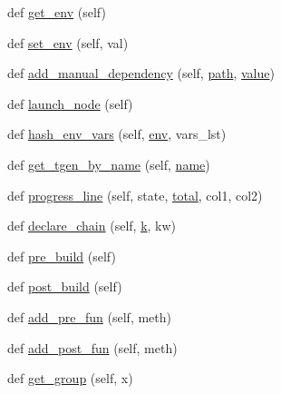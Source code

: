 \begin{DoxyCompactItemize}
\item 
def \hyperlink{classwaflib_1_1_build_1_1_build_context_a39240d22a6d298b74dabc40d8fb193a8}{get\+\_\+env} (self)
\item 
def \hyperlink{classwaflib_1_1_build_1_1_build_context_a8605b754128e554773a5962b55ec0741}{set\+\_\+env} (self, val)
\item 
def \hyperlink{classwaflib_1_1_build_1_1_build_context_aa550cf2655c922455d53077b4f1e4be1}{add\+\_\+manual\+\_\+dependency} (self, \hyperlink{classwaflib_1_1_build_1_1_build_context_afe3db622272692d0069d8b0f66c54a2c}{path}, \hyperlink{lib_2expat_8h_a4a30a13b813682e68c5b689b45c65971}{value})
\item 
def \hyperlink{classwaflib_1_1_build_1_1_build_context_a5ec1b12e273a3fcd437fd1e61292e8a1}{launch\+\_\+node} (self)
\item 
def \hyperlink{classwaflib_1_1_build_1_1_build_context_a4df53c421fdd1ea43eacfe0ec268fb07}{hash\+\_\+env\+\_\+vars} (self, \hyperlink{classwaflib_1_1_build_1_1_build_context_ac3b464a969bc6c898c739b6d820b2219}{env}, vars\+\_\+lst)
\item 
def \hyperlink{classwaflib_1_1_build_1_1_build_context_a158dba08b64d4a73b21a907ebe577017}{get\+\_\+tgen\+\_\+by\+\_\+name} (self, \hyperlink{lib_2expat_8h_a1b49b495b59f9e73205b69ad1a2965b0}{name})
\item 
def \hyperlink{classwaflib_1_1_build_1_1_build_context_af6341267231cfa8cabdfd595aede71fc}{progress\+\_\+line} (self, state, \hyperlink{classwaflib_1_1_build_1_1_build_context_a9242bac9596041fb6e91bd4f7cdbac51}{total}, col1, col2)
\item 
def \hyperlink{classwaflib_1_1_build_1_1_build_context_a6d24341f3d68e2a5a3987300d3d017fa}{declare\+\_\+chain} (self, \hyperlink{rfft2d_test_m_l_8m_adc468c70fb574ebd07287b38d0d0676d}{k}, kw)
\item 
def \hyperlink{classwaflib_1_1_build_1_1_build_context_a31b06f39986abefe3e129998b079f679}{pre\+\_\+build} (self)
\item 
def \hyperlink{classwaflib_1_1_build_1_1_build_context_aa8a25dd6bc5b621fa21d9806525e03df}{post\+\_\+build} (self)
\item 
def \hyperlink{classwaflib_1_1_build_1_1_build_context_a6ebf18db9a2bccd92de1506d261d7f03}{add\+\_\+pre\+\_\+fun} (self, meth)
\item 
def \hyperlink{classwaflib_1_1_build_1_1_build_context_a64d6fb9f73868bc70922fabaa0682fef}{add\+\_\+post\+\_\+fun} (self, meth)
\item 
def \hyperlink{classwaflib_1_1_build_1_1_build_context_ae9d4d76df236217e6c1ba262df1a7376}{get\+\_\+group} (self, x)

\end{DoxyCompactItemize}
